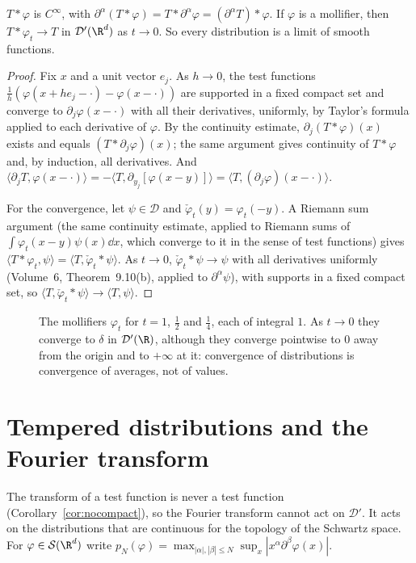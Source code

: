 \begin{proposition}\label{prop:smoothing}
$T*\varphi$ is $C^\infty$, with $\partial^\alpha(T*\varphi)=T*\partial^\alpha\varphi=(\partial^\alpha T)*\varphi$. If $\varphi$ is a mollifier, then $T*\varphi_t\to T$ in $\mathcal D'(\R^d)$ as $t\to0$. So every distribution is a limit of smooth
functions.
\end{proposition}
\begin{proof}
Fix $x$ and a unit vector $e_j$. As $h\to0$, the test functions $\frac1h(\varphi(x+he_j-\cdot)-\varphi(x-\cdot))$ are supported in a fixed compact set and converge to $\partial_j\varphi(x-\cdot)$ with all their derivatives, uniformly, by
Taylor's formula applied to each derivative of $\varphi$. By the continuity estimate, $\partial_j(T*\varphi)(x)$ exists and equals $(T*\partial_j\varphi)(x)$; the same argument gives continuity of $T*\varphi$ and, by
induction, all derivatives. And $\langle\partial_jT,\varphi(x-\cdot)\rangle=-\langle T,\partial_{y_j}[\varphi(x-y)]\rangle=\langle T,(\partial_j\varphi)(x-\cdot)\rangle$.

For the convergence, let $\psi\in\mathcal D$ and $\check\varphi_t(y)=\varphi_t(-y)$. A Riemann sum argument (the same continuity estimate, applied to Riemann sums of $\int\varphi_t(x-y)\psi(x)\dd x$, which converge to it in the sense of
test functions) gives $\langle T*\varphi_t,\psi\rangle=\langle T,\check\varphi_t*\psi\rangle$. As $t\to0$, $\check\varphi_t*\psi\to\psi$ with all derivatives uniformly (Volume~6, Theorem~9.10(b), applied to $\partial^\alpha\psi$), with
supports in a fixed compact set, so $\langle T,\check\varphi_t*\psi\rangle\to\langle T,\psi\rangle$.
\end{proof}

\begin{figure}[ht]
\centering
{}
\caption{The mollifiers $\varphi_t$ for $t=1$, $\frac12$ and $\frac14$, each of integral $1$. As $t\to0$ they converge to $\delta$ in $\mathcal D'(\R)$, although they converge pointwise to $0$ away from the origin and to
$+\infty$ at it: convergence of distributions is convergence of averages, not of values.}
\label{fig:dirac}
\end{figure}

\section{Tempered distributions and the Fourier transform}

The transform of a test function is never a test function (Corollary~\ref{cor:nocompact}), so the Fourier transform cannot act on $\mathcal D'$. It acts on the distributions that are continuous for the topology of the Schwartz space.
For $\varphi\in\mathcal S(\R^d)$ write $p_N(\varphi)=\max_{|\alpha|,|\beta|\le N}\sup_x|x^\alpha\partial^\beta\varphi(x)|$.

